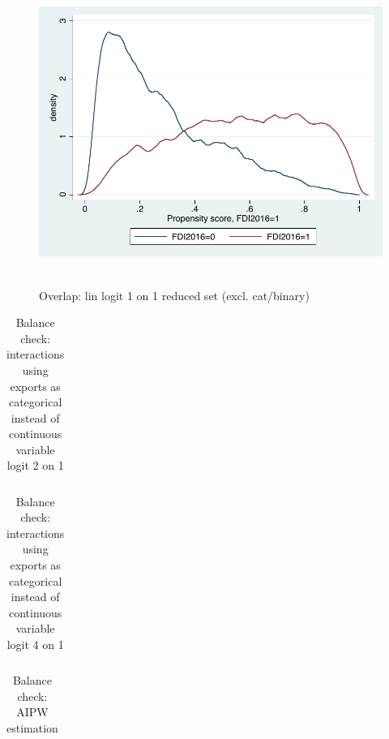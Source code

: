 \begin{figure}
	\centering
	\includegraphics[scale=0.6]{figures_and_tables/3_overlap_linearlogit1o1_reduced.pdf}\
	\caption{Overlap: lin logit 1 on 1 reduced set (excl. cat/binary) }
	\label{ol_linlog1_red}
\end{figure}

\begin{table}
	\begin{tabular}{lcccc}
		 \hline \hline
	
	 \hline \hline
	\end{tabular}
	\caption{Balance check: interactions using exports as categorical instead of continuous variable logit 2 on 1}
	\label{bal_intcatlog2}
\end{table}

\begin{table}
	\begin{tabular}{lcccc}
		 \hline \hline
	
	 \hline \hline
	\end{tabular}
	\caption{Balance check: interactions using exports as categorical instead of continuous variable logit 4 on 1}
	\label{bal_intcatlog4}
\end{table}

\begin{table}
	\begin{tabular}{lcccc}
		 \hline \hline
		
		 \hline \hline
	\end{tabular}
	\caption{Balance check: AIPW estimation}
	\label{bal_aipw}
\end{table}
